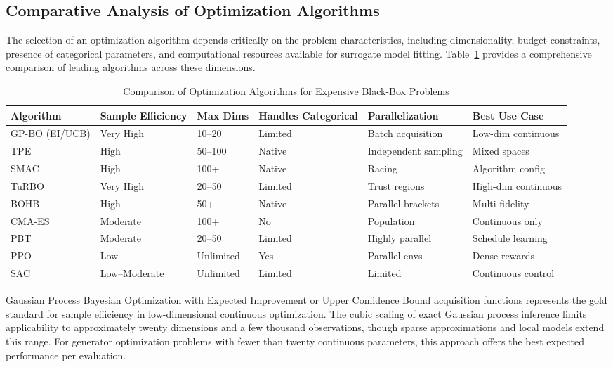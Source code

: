 \subsection{Comparative Analysis of Optimization Algorithms}
\label{subsec:algorithm_comparison}

The selection of an optimization algorithm depends critically on the problem characteristics, including dimensionality, budget constraints, presence of categorical parameters, and computational resources available for surrogate model fitting. Table~\ref{tab:algorithm_comparison} provides a comprehensive comparison of leading algorithms across these dimensions.

\begin{table}[htbp]
\centering
\caption{Comparison of Optimization Algorithms for Expensive Black-Box Problems}
\label{tab:algorithm_comparison}
\renewcommand{\arraystretch}{1.3}
\begin{tabular}{|p{2.2cm}|p{1.8cm}|p{1.5cm}|p{2.0cm}|p{2.2cm}|p{2.5cm}|}
\hline
\textbf{Algorithm} & \textbf{Sample Efficiency} & \textbf{Max Dims} & \textbf{Handles Categorical} & \textbf{Parallelization} & \textbf{Best Use Case} \\
\hline
GP-BO (EI/UCB) & Very High & 10--20 & Limited & Batch acquisition & Low-dim continuous \\
\hline
TPE & High & 50--100 & Native & Independent sampling & Mixed spaces \\
\hline
SMAC & High & 100+ & Native & Racing & Algorithm config \\
\hline
TuRBO & Very High & 20--50 & Limited & Trust regions & High-dim continuous \\
\hline
BOHB & High & 50+ & Native & Parallel brackets & Multi-fidelity \\
\hline
CMA-ES & Moderate & 100+ & No & Population & Continuous only \\
\hline
PBT & Moderate & 20--50 & Limited & Highly parallel & Schedule learning \\
\hline
PPO & Low & Unlimited & Yes & Parallel envs & Dense rewards \\
\hline
SAC & Low--Moderate & Unlimited & Limited & Limited & Continuous control \\
\hline
\end{tabular}
\end{table}

Gaussian Process Bayesian Optimization with Expected Improvement or Upper Confidence Bound acquisition functions represents the gold standard for sample efficiency in low-dimensional continuous optimization. The cubic scaling of exact Gaussian process inference limits applicability to approximately twenty dimensions and a few thousand observations, though sparse approximations and local models extend this range. For generator optimization problems with fewer than twenty continuous parameters, this approach offers the best expected performance per evaluation.

